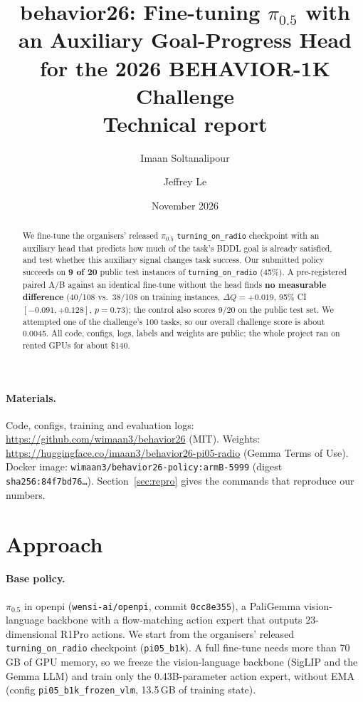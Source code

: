 \documentclass[10pt]{article}
\title{behavior26: Fine-tuning $\pi_{0.5}$ with an Auxiliary Goal-Progress Head\\for the 2026 BEHAVIOR-1K Challenge\\[4pt]\large Technical report}
\author{Imaan Soltanalipour \and Jeffrey Le}
\date{November 2026}
\newcommand{\code}[1]{\texttt{#1}}
\begin{document}
\maketitle

\begin{abstract}
We fine-tune the organisers' released $\pi_{0.5}$ \code{turning\_on\_radio} checkpoint with an
auxiliary head that predicts how much of the task's BDDL goal is already satisfied, and test
whether this auxiliary signal changes task success. Our submitted policy succeeds on
\textbf{9 of 20} public test instances of \code{turning\_on\_radio} (45\%). A pre-registered
paired A/B against an identical fine-tune without the head finds \textbf{no measurable
difference} (40/108 vs.\ 38/108 on training instances, $\Delta Q = +0.019$, 95\% CI
$[-0.091, +0.128]$, $p = 0.73$); the control also scores 9/20 on the public test set. We
attempted one of the challenge's 100 tasks, so our overall challenge score is about 0.0045.
All code, configs, logs, labels and weights are public; the whole project ran on rented GPUs
for about \$140.
\end{abstract}

\paragraph{Materials.}
Code, configs, training and evaluation logs: \url{https://github.com/wimaan3/behavior26} (MIT).
Weights: \url{https://huggingface.co/imaan3/behavior26-pi05-radio} (Gemma Terms of Use).
Docker image: \code{wimaan3/behavior26-policy:armB-5999} (digest \code{sha256:84f7bd76\ldots}).
Section~\ref{sec:repro} gives the commands that reproduce our numbers.

\section{Approach}

\paragraph{Base policy.}
$\pi_{0.5}$ in openpi (\code{wensi-ai/openpi}, commit \code{0cc8e355}), a PaliGemma
vision-language backbone with a flow-matching action expert that outputs 23-dimensional R1Pro
actions. We start from the organisers' released \code{turning\_on\_radio} checkpoint
(\code{pi05\_b1k}). A full fine-tune needs more than 70\,GB of GPU memory, so we freeze the
vision-language backbone (SigLIP and the Gemma LLM) and train only the 0.43B-parameter action
expert, without EMA (config \code{pi05\_b1k\_frozen\_vlm}, 13.5\,GB of training state).
\end{document}
